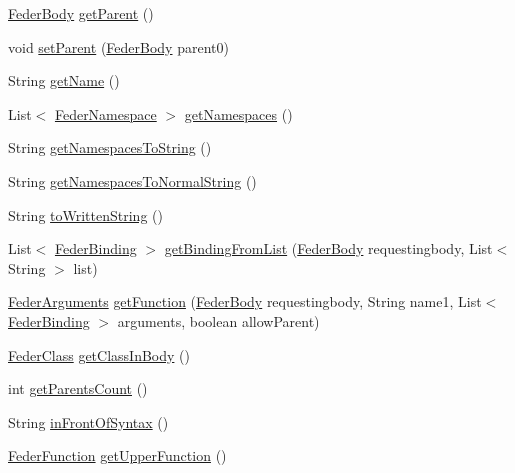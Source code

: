 \begin{DoxyCompactItemize}
\item 
\hyperlink{classfeder_1_1types_1_1FederBody}{Feder\+Body} \hyperlink{classfeder_1_1types_1_1FederBody_abd9f05e0abc4dd97e9ef3e6df440968b}{get\+Parent} ()
\item 
void \hyperlink{classfeder_1_1types_1_1FederBody_a0c773c1b19c9fb19e27270674ebd54e0}{set\+Parent} (\hyperlink{classfeder_1_1types_1_1FederBody}{Feder\+Body} parent0)
\item 
String \hyperlink{classfeder_1_1types_1_1FederBody_a7d32aee068f32d2cc132df84b32f16c2}{get\+Name} ()
\item 
List$<$ \hyperlink{classfeder_1_1types_1_1FederNamespace}{Feder\+Namespace} $>$ \hyperlink{classfeder_1_1types_1_1FederBody_a8921df8000dc7b7c5894f4871f162cfb}{get\+Namespaces} ()
\item 
String \hyperlink{classfeder_1_1types_1_1FederBody_aa71817818b5b4c8ae05e3e520240cbb3}{get\+Namespaces\+To\+String} ()
\item 
String \hyperlink{classfeder_1_1types_1_1FederBody_a0ced009ee53ed04b803fed0b2237538c}{get\+Namespaces\+To\+Normal\+String} ()
\item 
String \hyperlink{classfeder_1_1types_1_1FederBody_ab31ab3308f48585665e6367f776c1d71}{to\+Written\+String} ()
\item 
List$<$ \hyperlink{classfeder_1_1types_1_1FederBinding}{Feder\+Binding} $>$ \hyperlink{classfeder_1_1types_1_1FederBody_a119382c9410b28689420735a3863d08f}{get\+Binding\+From\+List} (\hyperlink{classfeder_1_1types_1_1FederBody}{Feder\+Body} requestingbody, List$<$ String $>$ list)
\item 
\hyperlink{interfacefeder_1_1types_1_1FederArguments}{Feder\+Arguments} \hyperlink{classfeder_1_1types_1_1FederBody_a206376c3ed2efe89fe570f996118ce29}{get\+Function} (\hyperlink{classfeder_1_1types_1_1FederBody}{Feder\+Body} requestingbody, String name1, List$<$ \hyperlink{classfeder_1_1types_1_1FederBinding}{Feder\+Binding} $>$ arguments, boolean allow\+Parent)
\item 
\hyperlink{classfeder_1_1types_1_1FederClass}{Feder\+Class} \hyperlink{classfeder_1_1types_1_1FederBody_a31c99a87dddae5d4e5b5d1a7bc0af98f}{get\+Class\+In\+Body} ()
\item 
int \hyperlink{classfeder_1_1types_1_1FederBody_a578373bc7ed4a41102f7bf8ef1aa1c88}{get\+Parents\+Count} ()
\item 
String \hyperlink{classfeder_1_1types_1_1FederBody_a3a0f5cccf7ec89b1e0af8f958236c9aa}{in\+Front\+Of\+Syntax} ()
\item 
\hyperlink{classfeder_1_1types_1_1FederFunction}{Feder\+Function} \hyperlink{classfeder_1_1types_1_1FederBody_a95db3cb467da96aec741f286042e7bbc}{get\+Upper\+Function} ()

\end{DoxyCompactItemize}
